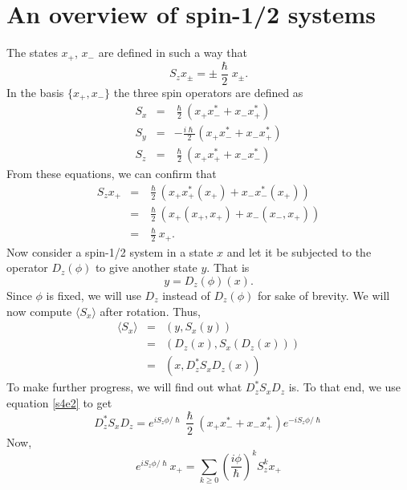 \documentclass{article}
\numberwithin{equation}{section}
\newcommand{\qev}[1]{\langle #1 \rangle}
\begin{document}
\section{An overview of spin-1/2 systems}\label{s4}
The states $x_+$, $x_-$ are defined in such a way that
\begin{equation}\label{s4e1}
S_zx_{\pm} = \pm\frac{\hslash}{2}x_\pm.
\end{equation}
In the basis $\{x_+, x_-\}$ the three spin operators are defined as
\begin{eqnarray}
S_x &=& \frac{\hslash}{2}(x_+ x_-^\ast + x_- x_+^\ast) \label{s4e2} \\
S_y &=& -\frac{i\hslash}{2}(x_+ x_-^\ast + x_- x_+^\ast) \label{s4e3} \\
S_z &=& \frac{\hslash}{2}(x_+ x_+^\ast + x_- x_-^\ast) \label{s4e4}
\end{eqnarray}
From these equations, we can confirm that
\begin{eqnarray}
S_z x_+ &=& \frac{\hslash}{2}\left( x_+ x_+^\ast(x_+) + x_-x_-^\ast(x_+)\right)
\nonumber \\
 &=& \frac{\hslash}{2}\left(x_+(x_+, x_+) + x_-(x_-, x_+)\right) \nonumber \\
 &=& \frac{\hslash}{2}x_+. \label{s4e5}
\end{eqnarray}
Now consider a spin-1/2 system in a state $x$ and let it be subjected to the
operator $D_z(\phi)$ to give another state $y$. That is
\begin{equation}\label{s4e6}
y = D_z(\phi)(x).
\end{equation}
Since $\phi$ is fixed, we will use $D_z$ instead of $D_z(\phi)$ for sake of
brevity. We will now compute $\qev{S_x}$ after rotation. Thus,
\begin{eqnarray}
\qev{S_x} &=& (y, S_x(y)) \nonumber \\
 &=& (D_z(x), S_x(D_z(x))) \nonumber \\
 &=& (x, D_z^\ast S_x D_z (x)) \label{s4e7}
\end{eqnarray}
To make further progress, we will find out what $D_z^\ast S_xD_z$ is. To that
end, we use equation \eqref{s4e2} to get
\begin{equation}\label{s4e8}
D_z^\ast S_x D_z = e^{iS_z\phi/\hslash}\frac{\hslash}{2}(x_+x_-^\ast + 
x_-x_+^\ast)e^{-iS_z\phi/\hslash}
\end{equation}
Now,
\begin{equation}\label{s4e9}
e^{iS_z\phi/\hslash}x_+ = 
\sum_{k \ge 0}\left(\frac{i\phi}{\hslash}\right)^kS_z^k x_+
\end{equation}
\end{document}
